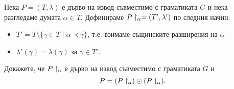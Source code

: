 \begin{problem}
  Нека $P = (T,\lambda)$ е дърво на извод съвместимо с граматиката $G$ и нека разгледаме думата $\alpha \in T$.
  Дефинираме ${P}\upharpoonright_{\alpha} = (T',\lambda')$ по следния начин:
  \begin{itemize}
  \item
    $T' = T \setminus \{ \gamma \in T\mid \alpha \prec \gamma\}$, т.е. взимаме същинските разширения на $\alpha$
  \item
    $\lambda'(\gamma) = \lambda(\gamma)$ за $\gamma \in T'$.
  \end{itemize}
  Докажете, че ${P}\upharpoonright_{\alpha}$ е дърво на извод съвместимо с граматиката $G$ и 
  \[P = ({P}\upharpoonright_{\alpha}) \odot ({P}\downharpoonright_{\alpha}).\]
\end{problem}
